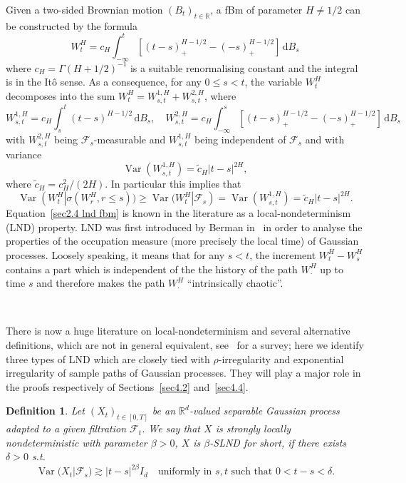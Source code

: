 \documentclass[10pt]{article}
\newcommand{\mathd}{\mathrm{d}}
\newcommand{\nobracket}{}
\newcommand{\tmop}[1]{\ensuremath{\operatorname{#1}}}
\newtheorem{definition}[theorem]{Definition}
\begin{document}
Given a two-sided Brownian motion $(B_t)_{t \in \mathbb{R}}$, a fBm of
parameter $H \neq 1 / 2$ can be constructed by the formula
\begin{equation}
  W^H_t = c_H \int_{- \infty}^t [(t - s)^{H - 1 / 2}_+ - (- s)_+^{H - 1 / 2}]
  \, \mathd B_s \label{sec2.4 non canonical representation}
\end{equation}
where $c_H = \Gamma (H + 1 / 2)^{- 1}$ is a suitable renormalising constant
and the integral is in the It\^{o} sense. As a consequence, for any $0
\leqslant s < t$, the variable $W^H_t$ decomposes into the sum $W^H_t = W^{1,
H}_{s, t} + W^{2, H}_{s, t}$, where
\[ W^{1, H}_{s, t} = c_H \int_s^t (t - s)^{H - 1 / 2} \, \mathd B_s, \quad
   W^{2, H}_{s, t} = c_H \int_{- \infty}^s [(t - s)^{H - 1 / 2}_+ - (- s)_+^{H
   - 1 / 2}] \, \mathd B_s \]
with $W^{2, H}_{s, t}$ being $\mathcal{F}_s$-measurable and $W^{1, H}_{s, t}$
being independent of $\mathcal{F}_s$ and with variance
\[ \tmop{Var} (W^{1, H}_{s, t}) = \tilde{c}_H | t - s |^{2 H}, \]
where $\tilde{c}_H = c_H^2 / (2 H)$. In particular this implies that
\begin{equation}
  \tmop{Var} (W^H_t | \sigma (W^H_r, r \leqslant s \nobracket)) \geqslant
  \tmop{Var} (W^H_t | \mathcal{F}_s \nobracket) = \tmop{Var} (W^{1, H}_{s, t})
  = \tilde{c}_H | t - s |^{2 H} . \label{sec2.4 lnd fbm}
\end{equation}
Equation~{\eqref{sec2.4 lnd fbm}} is known in the literature as a
local\mbox{-}nondeterminism (LND) property. LND was first introduced by Berman
in~{\cite{berman73}} in order to analyse the properties of the occupation
measure (more precisely the local time) of Gaussian processes. Loosely
speaking, it means that for any $s < t$, the increment $W_t^H - W^H_s$
contains a part which is independent of the the history of the path
$W^H_{\cdot}$ up to time $s$ and therefore makes the path $W^H_{\cdot}$
``intrinsically chaotic''.

\

There is now a huge literature on local\mbox{-}nondeterminism and several
alternative definitions, which are not in general equivalent,
see~{\cite{xiao}} for a survey; here we identify three types of LND which are
closely tied with $\rho$\mbox{-}irregularity and exponential irregularity of
sample paths of Gaussian processes. They will play a major role in the proofs
respectively of Sections~\ref{sec4.2} and~\ref{sec4.4}.

\begin{definition}
  \label{sec2.4 defn strong lnd}Let $(X_t)_{t \in [0, T]}$ be an
  $\mathbb{R}^d$-valued separable Gaussian process adapted to a given
  filtration $\mathcal{F}_t$. We say that $X$ is strongly locally
  nondeterministic with parameter $\beta > 0$, $X$ is $\beta$\mbox{-}SLND for
  short, if there exists $\delta > 0$ s.t.
  \begin{equation}
    \tmop{Var} (X_t | \mathcal{F}_s \nobracket) \gtrsim | t - s |^{2 \beta}
    I_d \quad \text{uniformly in } s, t \text{ such that } 0 < t - s < \delta
    . \label{sec2.4 strong lnd eq}
  \end{equation}
\end{definition}
\end{document}
